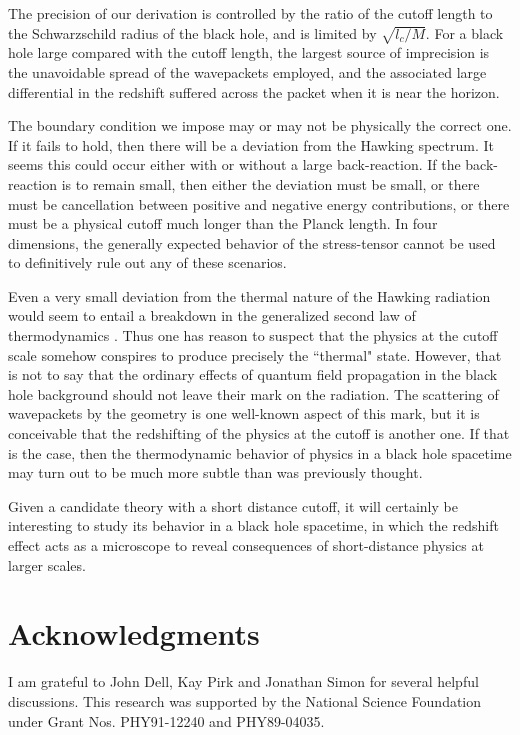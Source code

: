 \documentclass[12pt]{article}
\begin{document}
The precision of our derivation is controlled by the
ratio of the cutoff length to the Schwarzschild radius
of the black hole, and is limited by $\sqrt{l_c/M}$.
For a black hole large compared with
the cutoff length, the largest source of imprecision
is the unavoidable spread of the wavepackets employed,
and the associated large differential in the redshift suffered
across the packet when it is near the horizon.

The boundary condition we impose may
or may not be physically the correct one.
If it fails to hold, then there will be a deviation from
the Hawking spectrum. It seems this could occur either with or without
a large back-reaction. If the back-reaction is to remain small,
then either the deviation must be small, or there must be cancellation
between positive and negative energy contributions, or there must
be a physical cutoff much longer than the Planck length.
In four dimensions, the generally expected behavior of the
stress-tensor cannot be used to definitively
rule out any of these scenarios.

Even a very small deviation from the
thermal nature of the Hawking radiation would seem to entail a
breakdown in the generalized second law of
thermodynamics \cite{Beck,UnWald,ThorneZurek}.
Thus one has reason to suspect that the
physics at the cutoff scale somehow conspires to
produce precisely the ``thermal" state. However, that is not
to say that the ordinary effects of quantum field
propagation in the black hole background should not
leave their mark on the radiation. The scattering of
wavepackets by
the geometry is one well-known aspect of this mark,
but it is conceivable that the redshifting of the
physics at the cutoff is another one. If that is the
case, then the thermodynamic behavior of physics in a
black hole spacetime may turn out to be much more
subtle than was previously thought.

Given a candidate theory with a short distance cutoff,
it will certainly be interesting to study its behavior
in a black hole spacetime, in which the redshift
effect acts as a microscope to reveal consequences of
short-distance physics at larger scales.

\section*{Acknowledgments}

I am grateful to John Dell, Kay Pirk and Jonathan Simon for several
helpful discussions. This research was supported by
the National Science Foundation under Grant Nos. PHY91-12240
and PHY89-04035.
\end{document}
